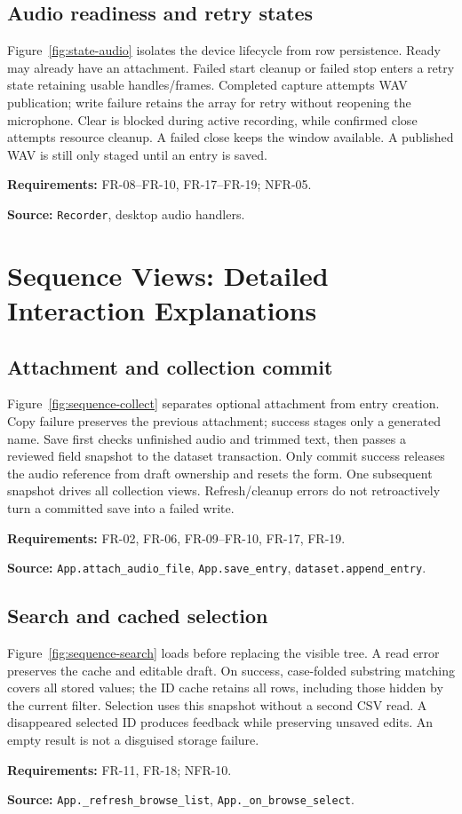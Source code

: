 \documentclass[11pt,a4paper]{article}
\newcommand{\viewtrace}[2]{\par\smallskip\noindent\textbf{Requirements:} #1.\par
  \noindent\textbf{Source:} #2.\par\medskip}
\begin{document}
\subsection{Audio readiness and retry states}
Figure~\ref{fig:state-audio} isolates the device lifecycle from row persistence.
Ready may already have an attachment. Failed start cleanup or failed stop
enters a retry state retaining usable handles/frames. Completed capture
attempts WAV publication; write failure retains the array for retry without
reopening the microphone. Clear is blocked during active recording, while
confirmed close attempts resource cleanup. A failed close keeps the window
available. A published WAV is still only staged until an entry is saved.
\viewtrace{FR-08--FR-10, FR-17--FR-19; NFR-05}{\nolinkurl{Recorder}, desktop audio handlers}

\section{Sequence Views: Detailed Interaction Explanations}
\subsection{Attachment and collection commit}
Figure~\ref{fig:sequence-collect} separates optional attachment from entry
creation. Copy failure preserves the previous attachment; success stages only
a generated name. Save first checks unfinished audio and trimmed text, then
passes a reviewed field snapshot to the dataset transaction. Only commit
success releases the audio reference from draft ownership and resets the form.
One subsequent snapshot drives all collection views. Refresh/cleanup errors
do not retroactively turn a committed save into a failed write.
\viewtrace{FR-02, FR-06, FR-09--FR-10, FR-17, FR-19}
{\nolinkurl{App.attach_audio_file}, \nolinkurl{App.save_entry}, \nolinkurl{dataset.append_entry}}

\subsection{Search and cached selection}
Figure~\ref{fig:sequence-search} loads before replacing the visible tree.
A read error preserves the cache and editable draft. On success, case-folded
substring matching covers all stored values; the ID cache retains all rows,
including those hidden by the current filter. Selection uses this snapshot
without a second CSV read. A disappeared selected ID produces feedback while
preserving unsaved edits. An empty result is not a disguised storage failure.
\viewtrace{FR-11, FR-18; NFR-10}{\nolinkurl{App._refresh_browse_list}, \nolinkurl{App._on_browse_select}}
\end{document}
